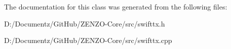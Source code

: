 The documentation for this class was generated from the following files\+:\begin{DoxyCompactItemize}
\item 
D\+:/\+Documentz/\+Git\+Hub/\+Z\+E\+N\+Z\+O-\/\+Core/src/swifttx.\+h\item 
D\+:/\+Documentz/\+Git\+Hub/\+Z\+E\+N\+Z\+O-\/\+Core/src/swifttx.\+cpp\end{DoxyCompactItemize}
